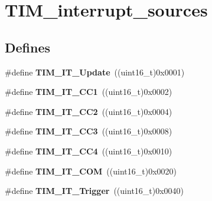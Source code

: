 \hypertarget{group__TIM__interrupt__sources}{
\section{TIM\_\-interrupt\_\-sources}
\label{group__TIM__interrupt__sources}
}
\subsection*{Defines}
\begin{DoxyCompactItemize}
\item 
\hypertarget{group__TIM__interrupt__sources_ga8fb63577fec9a3e7c7f5f3eb775ee624}{
\#define {\bfseries TIM\_\-IT\_\-Update}~((uint16\_\-t)0x0001)}
\label{group__TIM__interrupt__sources_ga8fb63577fec9a3e7c7f5f3eb775ee624}

\item 
\hypertarget{group__TIM__interrupt__sources_ga02267a938ab4722c5013fffa447cf5a6}{
\#define {\bfseries TIM\_\-IT\_\-CC1}~((uint16\_\-t)0x0002)}
\label{group__TIM__interrupt__sources_ga02267a938ab4722c5013fffa447cf5a6}

\item 
\hypertarget{group__TIM__interrupt__sources_ga60f6b6c424b62ca58d3fafd8f5955e4f}{
\#define {\bfseries TIM\_\-IT\_\-CC2}~((uint16\_\-t)0x0004)}
\label{group__TIM__interrupt__sources_ga60f6b6c424b62ca58d3fafd8f5955e4f}

\item 
\hypertarget{group__TIM__interrupt__sources_ga6aef020aebafd9e585283fbbaf8b841f}{
\#define {\bfseries TIM\_\-IT\_\-CC3}~((uint16\_\-t)0x0008)}
\label{group__TIM__interrupt__sources_ga6aef020aebafd9e585283fbbaf8b841f}

\item 
\hypertarget{group__TIM__interrupt__sources_ga1dce7f1bc32a258f2964cb7c05f413a6}{
\#define {\bfseries TIM\_\-IT\_\-CC4}~((uint16\_\-t)0x0010)}
\label{group__TIM__interrupt__sources_ga1dce7f1bc32a258f2964cb7c05f413a6}

\item 
\hypertarget{group__TIM__interrupt__sources_gaeb7eff6c39922814e7ee47c0820c3d9f}{
\#define {\bfseries TIM\_\-IT\_\-COM}~((uint16\_\-t)0x0020)}
\label{group__TIM__interrupt__sources_gaeb7eff6c39922814e7ee47c0820c3d9f}

\item 
\hypertarget{group__TIM__interrupt__sources_ga339629d21f2490729b28905f5c04bad1}{
\#define {\bfseries TIM\_\-IT\_\-Trigger}~((uint16\_\-t)0x0040)}
\label{group__TIM__interrupt__sources_ga339629d21f2490729b28905f5c04bad1}


\end{DoxyCompactItemize}

